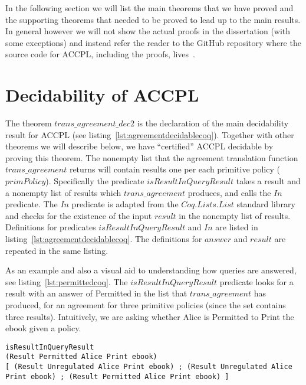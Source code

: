 In the following section we will list the main theorems that we have proved and the supporting theorems that needed to be proved to lead up to the main results. In general however we will not show the actual proofs in the dissertation (with some exceptions) and instead refer the reader to the GitHub repository where the source code for \ac{ACCPL}, including the proofs, lives~\cite{BahmanSistany2015}.

\section{Decidability of ACCPL}\label{sec:maintheorems}

The theorem $trans\_agreement\_dec2$ is the declaration of the main decidability result for \ac{ACCPL} (see listing~\ref{lst:agreementdecidablecoq}). Together with other theorems we will describe below, we have ``certified'' \ac{ACCPL} decidable by proving this theorem. The nonempty list that the agreement translation function $trans\_agreement$ returns will contain results one per each primitive policy ($primPolicy$). Specifically the predicate $isResultInQueryResult$ takes a result and a nonempty list of results which $trans\_agreement$ produces, and calls the $In$ predicate. The $In$ predicate is adapted from the $Coq.Lists.List$ standard library and checks for the existence of the input $result$ in the nonempty list of results. Definitions for predicates $isResultInQueryResult$ and $In$ are listed in listing~\ref{lst:agreementdecidablecoq}. The definitions for $answer$ and $result$ are repeated in the same listing. 

As an example and also a visual aid to understanding how queries are answered, see listing~\ref{lst:permittedcoq}. The $isResultInQueryResult$ predicate looks for a result with an answer of Permitted in the list that $trans\_agreement$ has produced, for an agreement for three primitive policies (since the set contains three results). Intuitively, we are asking whether Alice is Permitted to Print the ebook given a policy.  

\begin{lstlisting}
isResultInQueryResult
(Result Permitted Alice Print ebook) 
[ (Result Unregulated Alice Print ebook) ; (Result Unregulated Alice Print ebook) ; (Result Permitted Alice Print ebook) ]
\end{lstlisting}
    
